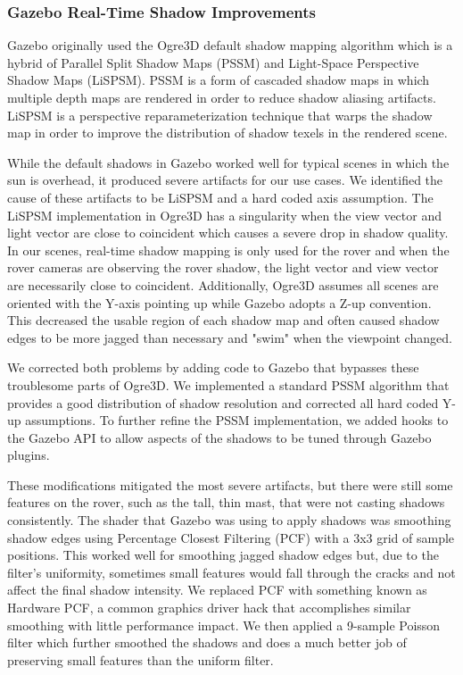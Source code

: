 \documentclass[twocolumn,letterpaper]{IEEEAerospaceCLS}  %
\begin{document}
\subsubsection{Gazebo Real-Time Shadow Improvements}
Gazebo originally used the Ogre3D default shadow mapping algorithm which is a hybrid of Parallel Split Shadow Maps (PSSM)\cite{zhang2006parallel} and Light-Space Perspective Shadow Maps (LiSPSM)\cite{wimmer2004light}.  PSSM is a form of cascaded shadow maps in which multiple depth maps are rendered in order to reduce shadow aliasing artifacts.  LiSPSM is a perspective reparameterization technique that warps the shadow map in order to improve the distribution of shadow texels in the rendered scene. 

While the default shadows in Gazebo worked well for typical scenes in which the sun is overhead, it produced severe artifacts for our use cases.  We identified the cause of these artifacts to be LiSPSM and a hard coded axis assumption.  
The LiSPSM implementation in Ogre3D has a singularity when the view vector and light vector are close to coincident which causes a severe drop in shadow quality.  
In our scenes, real-time shadow mapping is only used for the rover and when the rover cameras are observing the rover shadow, the light vector and view vector are necessarily close to coincident.  
Additionally, Ogre3D assumes all scenes are oriented with the Y-axis pointing up while Gazebo adopts a Z-up convention.  
This decreased the usable region of each shadow map and often caused shadow edges to be more jagged than necessary and "swim" when the viewpoint changed.  

We corrected both problems by adding code to Gazebo that bypasses these troublesome parts of Ogre3D.  
We implemented a standard PSSM algorithm that provides a good distribution of shadow resolution and corrected all hard coded Y-up assumptions.  To further refine the PSSM implementation, we added hooks to the Gazebo API to allow aspects of the shadows to be tuned through Gazebo plugins.  

These modifications mitigated the most severe artifacts, but there were still some features on the rover, such as the tall, thin mast, that were not casting shadows consistently.  
The shader that Gazebo was using to apply shadows was smoothing shadow edges using Percentage Closest Filtering (PCF) with a 3x3 grid of sample positions.  
This worked well for smoothing jagged shadow edges but, due to the filter's uniformity, sometimes small features would fall through the cracks and not affect the final shadow intensity.  
We replaced PCF with something known as Hardware PCF, a common graphics driver hack that accomplishes similar smoothing with little performance impact.  
We then applied a 9-sample Poisson filter which further smoothed the shadows and does a much better job of preserving small features than the uniform filter.
\end{document}

